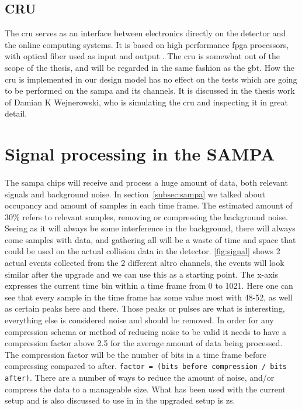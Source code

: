 \documentclass[a4paper, 12pt]{report}\dfrac{\right }{•}
\newcommand{\codeword}[1]{\texttt{#1}}
\begin{document}
\subsection{CRU}
The \gls{cru} serves as an interface between electronics directly on the detector and the online computing systems.
It is based on high performance \gls{fpga} processors, with optical fiber used as input and output \cite{tdr-015}. 
The \gls{cru} is somewhat out of the scope of the thesis, and will be regarded in the same fashion as the \gls{gbt}.
How the \gls{cru} is implemented in our design model has no effect on the tests which are going to be performed on the \gls{sampa} and its channels.
It is discussed in the thesis work of Damian K Wejnerowski, who is simulating the \gls{cru} and inspecting it in great detail.

\section{Signal processing in the SAMPA}
\paragraph{}
The \gls{sampa} chips will receive and process a huge amount of data, both relevant signals and background noise.
In section~\ref{subsec:sampa} we talked about occupancy and amount of samples in each time frame.
The estimated amount of 30\% refers to relevant samples, removing or compressing the background noise.
Seeing as it will always be some interference in the background, there will always come samples with data, and gathering all will be a waste of time and space that could be used on the actual collision data in the detector.
\ref{fig:signal} shows 2 actual events collected from the 2 different \gls{altro} channels, the events will look similar after the upgrade and we can use this as a starting point.
The x-axis expresses the current time bin within a time frame from 0 to 1021.
Here one can see that every sample in the time frame has some value most with 48-52, as well as certain peaks here and there.
Those peaks or pulses are what is interesting, everything else is considered noise and should be removed.
In order for any compression schema or method of reducing noise to be valid it needs to have a compression factor above 2.5 for the average amount of data being processed.
The compression factor will be the number of bits in a time frame before compressing compared to after. \codeword{factor = (bits before compression / bits after)}.
There are a number of ways to reduce the amount of noise, and/or compress the data to a manageable size.
What has been used with the current setup and is also discussed to use in in the upgraded setup is \gls{zs}.
\end{document}
